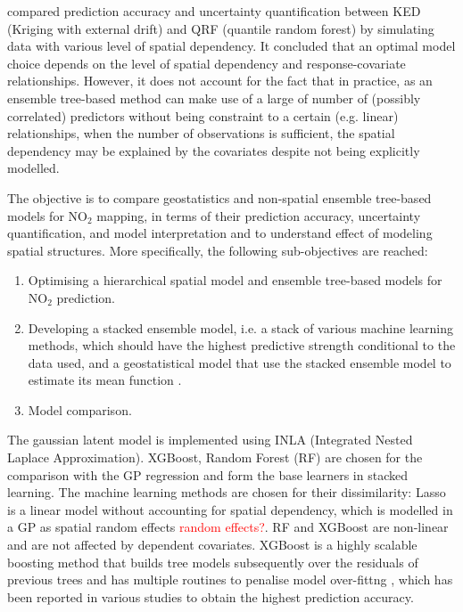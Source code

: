 \documentclass{article}
\begin{document}
\cite{fouedjio2019exploring} compared prediction accuracy and uncertainty quantification between KED (Kriging with external drift) and QRF (quantile random forest) \citep{meinshausen2006quantile} by simulating data with various level of spatial dependency. It concluded that an optimal model choice depends on the level of spatial dependency and response-covariate relationships. However, it does not account for the fact that in practice, as an ensemble tree-based method can make use of a large of number of (possibly correlated) predictors without being constraint to a certain (e.g. linear) relationships, when the number of observations is sufficient, the spatial dependency may be explained by the covariates despite not being explicitly modelled. 


The objective is to compare geostatistics and non-spatial ensemble tree-based models for NO$_2$ mapping, in terms of their prediction accuracy, uncertainty quantification, and model interpretation and to understand effect of modeling spatial structures. More specifically, the following sub-objectives are reached:

\begin{enumerate}
    \item Optimising a hierarchical spatial model and ensemble tree-based models for NO$_2$ prediction.
    
    \item Developing a stacked ensemble model, i.e. a stack of various machine learning methods, which should have the highest predictive strength conditional to the data used, and a geostatistical model that use the stacked ensemble model to estimate its mean function \citep{stackinla}.
    \item Model comparison. 
\end{enumerate}

 
 
The gaussian latent model is implemented using INLA (Integrated Nested Laplace Approximation). XGBoost, Random Forest (RF) are chosen for the comparison with the GP regression and form the base learners in stacked learning. The machine learning methods are chosen for their dissimilarity: Lasso is a linear model without accounting for spatial dependency, which is modelled in a GP as spatial random effects \textcolor{red}{random effects?}. RF and XGBoost are non-linear and are not affected by dependent covariates. XGBoost is a highly scalable boosting method that builds tree models subsequently over the residuals of previous trees and has multiple routines to penalise model over-fittng \citep{xgboost}, which has been reported in various studies to obtain the highest prediction accuracy\cite{luglobal}. 
\end{document}
